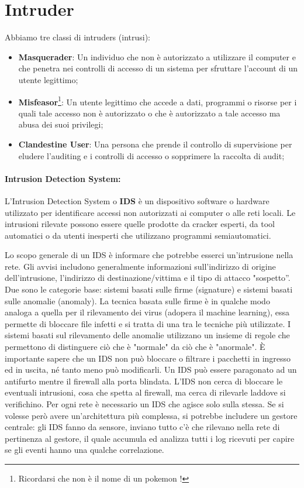 \section{Intruder}

Abbiamo tre classi di intruders (intrusi):

\begin{itemize}
      \item \textbf{Masquerader}: Un individuo che non è autorizzato a utilizzare il
            computer e che penetra nei
            controlli di accesso di un sistema per sfruttare l'account di un utente
            legittimo;
      \item \textbf{Misfeasor}\footnote{Ricordarsi che non è
                  il nome di un pokemon !}: Un utente legittimo che accede a dati,
            programmi o
            risorse per i
            quali tale
            accesso non è autorizzato o che è autorizzato a tale accesso ma
            abusa dei suoi
            privilegi;
      \item \textbf{Clandestine User}: Una persona che prende il controllo di supervisione
            per eludere l'auditing
            e i controlli di accesso o sopprimere la raccolta di audit;
\end{itemize}

\paragraph{Intrusion Detection System: }
L'Intrusion Detection System o \textbf{IDS} è un dispositivo software o hardware
utilizzato per
identificare accessi non autorizzati ai computer o alle reti locali.
Le intrusioni rilevate possono
essere quelle prodotte da cracker esperti, da tool automatici o da utenti
inesperti che utilizzano
programmi semiautomatici.

Lo scopo generale di un IDS è informare che potrebbe esserci un'intrusione nella rete.
Gli avvisi
includono generalmente informazioni sull'indirizzo di origine dell'intrusione,
l'indirizzo di
destinazione/vittima e il tipo di attacco "sospetto”.
Due sono le categorie base: sistemi basati sulle firme (signature) e sistemi
basati sulle anomalie (anomaly).
La tecnica basata sulle firme è in qualche modo analoga a quella per
il rilevamento dei
virus (adopera il machine learning), essa permette di bloccare file infetti e
si tratta di una tra le tecniche più utilizzate. I sistemi basati sul rilevamento delle anomalie utilizzano un
insieme di regole che
permettono di distinguere ciò che è "normale" da ciò che è "anormale".
È importante sapere che un IDS non può bloccare o filtrare i pacchetti in ingresso
ed in uscita, né
tanto meno può modificarli. Un IDS può essere paragonato ad un antifurto mentre
il firewall alla
porta blindata. L'IDS non cerca di bloccare le eventuali intrusioni, cosa che
spetta al firewall, ma
cerca di rilevarle laddove si verifichino.
Per ogni rete è necessario un IDS che agisce solo sulla stessa. Se si volesse
però avere
un'architettura più complessa, si potrebbe includere un gestore centrale:
gli IDS fanno da sensore,
inviano tutto c'è che rilevano nella rete di pertinenza al gestore,
il quale accumula ed analizza tutti i
log ricevuti per capire se gli eventi hanno una qualche correlazione.

